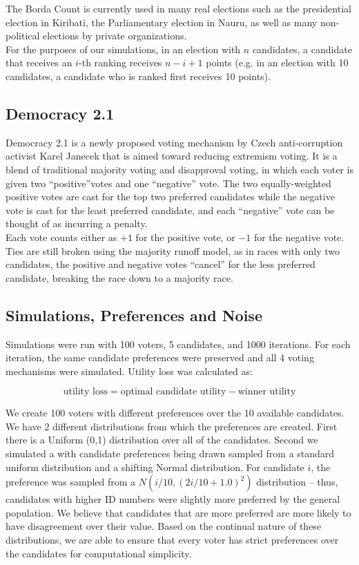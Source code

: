 \documentclass[11pt]{scrartcl}
\begin{document}
The Borda Count is currently used in many real elections such as the presidential election in Kiribati, the Parliamentary election in Nauru, as well as many non-political elections by private organizations. \\

For the purposes of our simulations, in an election with $n$ candidates, a candidate that receives an $i$-th ranking receives $n-i+ 1$ points (e.g. in an election with 10 candidates, a candidate who is ranked first receives 10 points). 

\subsection{Democracy 2.1} 

Democracy 2.1 is a newly proposed voting mechanism by Czech anti-corruption activist Karel Janecek that is aimed toward reducing extremism voting. It is a blend of traditional majority voting and disapproval voting, in which each voter is given two ``positive''votes and one ``negative'' vote. The two equally-weighted positive votes are cast for the top two preferred candidates while the negative vote is cast for the least preferred candidate, and each ``negative'' vote can be thought of as incurring a penalty.\\

Each vote counts either as $+1$ for the positive vote, or $-1$ for the negative vote. Ties are still broken using the majority runoff model, as in races with only two candidates, the positive and negative votes ``cancel'' for the less preferred candidate, breaking the race down to a majority race.

\subsection{Simulations, Preferences and Noise}

Simulations were run with 100 voters, 5 candidates, and 1000 iterations. For each iteration, the same candidate preferences were preserved and all 4 voting mechanisms were simulated. Utility loss was calculated as:

\[\textrm{utility loss} = \textrm{optimal candidate utility} - \textrm{winner utility}\]

We create 100 voters with different preferences over the 10 available candidates. We have 2 different distributions from which the preferences are created. First there is a Uniform (0,1) distribution over all of the candidates. Second we simulated a with candidate preferences being drawn sampled from a standard uniform distribution and a shifting Normal distribution. For candidate $i$, the preference was sampled from a $N(i/10, (2i/10 + 1.0)^2)$ distribution -- thus, candidates with higher ID numbers were slightly more preferred by the general population. We believe that candidates that are more preferred are more likely to have disagreement over their value. Based on the continual nature of these distributions, we are able to ensure that every voter has strict preferences over the candidates for computational simplicity.\\
\end{document}
